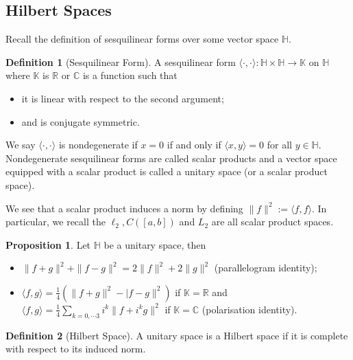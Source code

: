 \documentclass[]{article}
\theoremstyle{definition}
\theoremstyle{definition}
\newtheorem{definition}{Definition}[section]
\newtheorem{proposition}{Proposition}[section]
\begin{document}
\subsection{Hilbert Spaces}

Recall the definition of sesquilinear forms over some vector space \(\mathbb{H}\).

\begin{definition}[Sesquilinear Form]
  A sesquilinear form \(\langle \cdot, \cdot \rangle : 
  \mathbb{H} \times \mathbb{H} \to \mathbb{K}\) on \(\mathbb{H}\) where 
  \(\mathbb{K}\) is \(\mathbb{R}\) or \(\mathbb{C}\) is a function such that
  \begin{itemize}
    \item it is linear with respect to the second argument;
    \item and is conjugate symmetric.
  \end{itemize}
  We say \(\langle \cdot, \cdot \rangle\) is nondegenerate if \(x = 0\) if and 
  only if \(\langle x, y\rangle = 0\) for all \(y \in \mathbb{H}\). 
  Nondegenerate sesquilinear forms are called scalar products and a 
  vector space equipped with a scalar product is called a unitary space 
  (or a scalar product space).
\end{definition}

We see that a scalar product induces a norm by defining 
\(\|f\|^2 := \langle f, f \rangle\). In particular, we recall the 
\(\ell_2, C([a, b])\) and \(L_2\) are all scalar product spaces.

\begin{proposition}
  Let \(\mathbb{H}\) be a unitary space, then 
  \begin{itemize}
    \item \(\|f + g\|^2 + \|f - g\|^2 = 2 \|f\|^2 + 2\|g\|^2\) 
      (parallelogram identity);
    \item \(\langle f, g\rangle = \frac{1}{4}(\|f + g\|^2 - |f - g\|^2)\) if 
      \(\mathbb{K} = \mathbb{R}\) and 
      \(\langle f, g\rangle = \frac{1}{4} \sum_{k = 0, \cdots 3} 
      i^k \|f + i^k g\|^2\) if \(\mathbb{K} = \mathbb{C}\)
      (polarisation identity).
  \end{itemize}
\end{proposition}

\begin{definition}[Hilbert Space]
  A unitary space is a Hilbert space if it is complete with respect to its 
  induced norm.
\end{definition}
\end{document}
